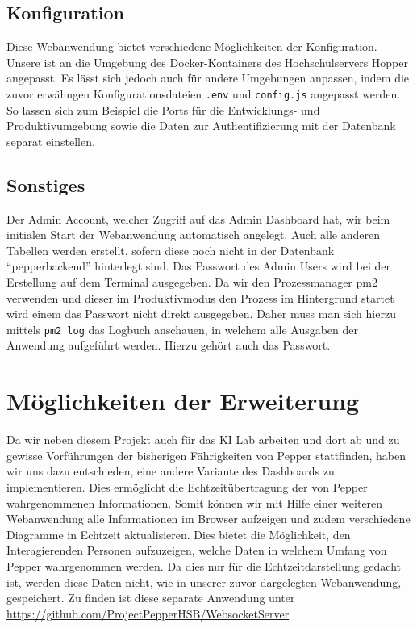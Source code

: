 \subsection*{Konfiguration}
\label{sec:nodechapter-config}
Diese Webanwendung bietet verschiedene Möglichkeiten der Konfiguration. Unsere ist an die Umgebung des Docker-Kontainers
des Hochschulservers Hopper angepasst. Es lässt sich jedoch auch für andere Umgebungen anpassen, indem die zuvor erwähngen
Konfigurationsdateien \verb|.env| und \verb|config.js| angepasst werden. So lassen sich zum Beispiel die Ports
für die Entwicklungs- und Produktivumgebung sowie die Daten zur Authentifizierung mit der Datenbank separat einstellen.\\


\subsection*{Sonstiges}
\label{sec:nodechapter-install-other}
Der Admin Account, welcher Zugriff auf das Admin Dashboard hat, wir beim initialen Start der Webanwendung automatisch angelegt.
Auch alle anderen Tabellen werden erstellt, sofern diese noch nicht in der Datenbank ``pepperbackend'' hinterlegt sind.
Das Passwort des Admin Users wird bei der Erstellung auf dem Terminal ausgegeben. Da wir den Prozessmanager pm2 verwenden
und dieser im Produktivmodus den Prozess im Hintergrund startet wird einem das Passwort nicht direkt ausgegeben. Daher muss
man sich hierzu mittels \verb|pm2 log| das Logbuch anschauen, in welchem alle Ausgaben der Anwendung aufgeführt werden. Hierzu
gehört auch das Passwort.\\


\section{Möglichkeiten der Erweiterung}
Da wir neben diesem Projekt auch für das KI Lab arbeiten und dort ab und zu gewisse Vorführungen der bisherigen Fährigkeiten von
Pepper stattfinden, haben wir uns dazu entschieden, eine andere Variante des Dashboards zu implementieren. Dies ermöglicht die
Echtzeitübertragung der von Pepper wahrgenommenen Informationen. Somit können wir mit Hilfe einer weiteren Webanwendung alle Informationen
im Browser aufzeigen und zudem verschiedene Diagramme in Echtzeit aktualisieren. Dies bietet die Möglichkeit, den Interagierenden Personen
aufzuzeigen, welche Daten in welchem Umfang von Pepper wahrgenommen werden. Da dies nur für die Echtzeitdarstellung gedacht ist,
werden diese Daten nicht, wie in unserer zuvor dargelegten Webanwendung, gespeichert. Zu finden ist diese separate Anwendung
unter \href{https://github.com/ProjectPepperHSB/WebsocketServer}{https://github.com/ProjectPepperHSB/WebsocketServer}

